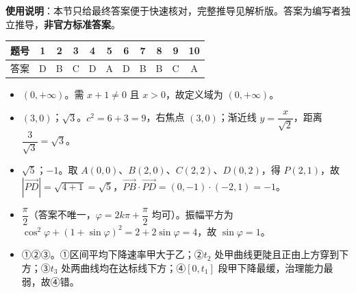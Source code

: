 
\begin{gknotice}
\textbf{使用说明}：本节只给最终答案便于快速核对，完整推导见解析版。答案为编写者独立推导，\textbf{非官方标准答案}。
\end{gknotice}

\begin{center}\begin{tabular}{ccccccccccc}
\toprule
题号 & 1 & 2 & 3 & 4 & 5 & 6 & 7 & 8 & 9 & 10 \\
\midrule
答案 & D & B & C & D & A & D & B & B & C & A \\
\bottomrule
\end{tabular}\end{center}

\begin{itemize}[leftmargin=2.6em]
  \item[\textbf{11.}] $(0,+\infty)$。需 $x+1\neq0$ 且 $x>0$，故定义域为 $(0,+\infty)$。
  \item[\textbf{12.}] $(3,0)$；$\sqrt3$。$c^2=6+3=9$，右焦点 $(3,0)$；渐近线 $y=\dfrac{x}{\sqrt2}$，距离 $\dfrac3{\sqrt3}=\sqrt3$。
  \item[\textbf{13.}] $\sqrt5$；$-1$。取 $A(0,0)$、$B(2,0)$、$C(2,2)$、$D(0,2)$，得 $P(2,1)$，故 $|\overrightarrow{PD}|=\sqrt{4+1}=\sqrt5$，$\overrightarrow{PB}\cdot\overrightarrow{PD}=(0,-1)\cdot(-2,1)=-1$。
  \item[\textbf{14.}] $\dfrac\pi2$（答案不唯一，$\varphi=2k\pi+\dfrac\pi2$ 均可）。振幅平方为 $\cos^2\varphi+(1+\sin\varphi)^2=2+2\sin\varphi=4$，故 $\sin\varphi=1$。
  \item[\textbf{15.}] ①②③。①区间平均下降速率甲大于乙；②$t_2$ 处甲曲线更陡且正由上方穿到下方；③$t_3$ 处两曲线均在达标线下方；④$[0,t_1]$ 段甲下降最缓，治理能力最弱，故④错。
\end{itemize}

